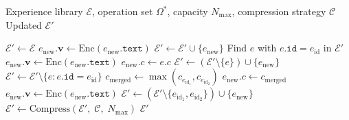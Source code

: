 \begin{algorithm}[H]
\caption{SemanticMemoryManager.Update}
\label{alg:memory-update}
\begin{algorithmic}[1]
\Require Experience library $\mathcal{E}$, operation set $\Omega^*$,
         capacity $N_{\max}$, compression strategy $\mathcal{C}$
\Ensure Updated $\mathcal{E}'$

\State $\mathcal{E}' \gets \mathcal{E}$
        \State $e_{\text{new}}.\bm{v} \gets \text{Enc}(e_{\text{new}}.\texttt{text})$
        \State $\mathcal{E}' \gets \mathcal{E}' \cup \{e_{\text{new}}\}$
        \State Find $e$ with $e.\texttt{id} = e_{\text{id}}$ in $\mathcal{E}'$
        \State $e_{\text{new}}.\bm{v} \gets \text{Enc}(e_{\text{new}}.\texttt{text})$
        \State $e_{\text{new}}.c \gets e.c$ 
        \State $\mathcal{E}' \gets (\mathcal{E}' \setminus \{e\}) \cup \{e_{\text{new}}\}$
        \State $\mathcal{E}' \gets \mathcal{E}' \setminus \{e : e.\texttt{id} = e_{\text{id}}\}$
        \State $c_{\text{merged}} \gets \max(c_{e_{\text{id}_1}}, c_{e_{\text{id}_2}})$
        \State $e_{\text{new}}.c \gets c_{\text{merged}}$
        \State $e_{\text{new}}.\bm{v} \gets \text{Enc}(e_{\text{new}}.\texttt{text})$
        \State $\mathcal{E}' \gets (\mathcal{E}' \setminus \{e_{\text{id}_1}, e_{\text{id}_2}\}) \cup \{e_{\text{new}}\}$
    \EndIf
\EndFor
{}
    \State $\mathcal{E}' \gets \text{Compress}(\mathcal{E}',\; \mathcal{C},\; N_{\max})$
\EndIf
\State \Return $\mathcal{E}'$
\end{algorithmic}
\end{algorithm}

